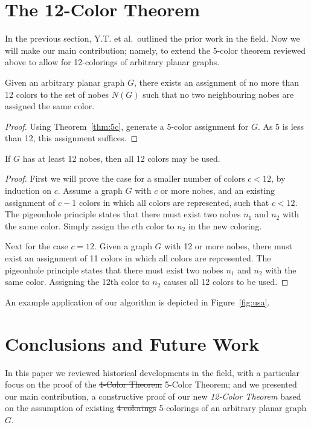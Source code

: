 \documentclass{article}
\begin{document}
\section{The 12-Color Theorem}

\thispagestyle{empty}
In the previous section, Y.T. et al.~outlined the prior work in the field. Now we will make our main contribution; namely, to extend the 5-color theorem reviewed above to allow for 12-colorings of arbitrary planar graphs.

\begin{theorem}
	Given an arbitrary planar graph $G$, there exists an assignment of no more than 12 colors to the set of nobes $N(G)$ such that no two neighbouring nobes are assigned the same color.
\end{theorem}

\begin{proof}
	Using Theorem~\ref{thm:5c}, generate a 5-color assignment for $G$. As 5 is less than 12, this assignment suffices.
\end{proof}

\begin{corollary}
	If $G$ has at least 12 nobes, then all 12 colors may be used.
\end{corollary}

\begin{proof}
	First we will prove the case for a smaller number of colors $c<12$, by induction on $c$. Assume a graph $G$ with $c$ or more nobes, and an existing assignment of $c-1$ colors in which all colors are represented, such that $c<12$. The pigeonhole principle states that there must exist two nobes $n_1$ and $n_2$ with the same color. Simply assign the $c$th color to $n_2$ in the new coloring.

	Next for the case $c=12$. Given a graph $G$ with 12 or more nobes, there must exist an assignment of 11 colors in which all colors are represented. The pigeonhole principle states that there must exist two nobes $n_1$ and $n_2$ with the same color. Assigning the 12th color to $n_2$ causes all 12 colors to be used.
\end{proof}

An example application of our algorithm is depicted in Figure~\ref{fig:usa}.


\section{Conclusions and Future Work}

In this paper we reviewed historical developments in the field, with a particular focus on the proof of the \sout{4-Color Theorem} 5-Color Theorem; and we presented our main contribution, a constructive proof of our new \textit{12-Color Theorem} based on the assumption of existing \sout{4-colorings} 5-colorings of an arbitrary planar graph $G$.
\end{document}
